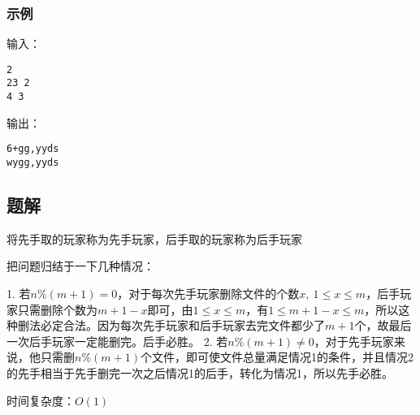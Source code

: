\subsubsection{示例}
输入：
\begin{lstlisting}
2
23 2
4 3
\end{lstlisting}

输出：
\begin{lstlisting}
6+gg,yyds
wygg,yyds
\end{lstlisting}

\subsection{题解}
将先手取的玩家称为先手玩家，后手取的玩家称为后手玩家

把问题归结于一下几种情况：

1. 若$n \% (m + 1) =0$，对于每次先手玩家删除文件的个数$x, \ 1 \leq x \leq m$，后手玩家只需删除个数为$m + 1 -x$即可，由$1 \leq x \leq m$，有$1 \leq m + 1 - x \leq m$，所以这种删法必定合法。因为每次先手玩家和后手玩家去完文件都少了$m + 1$个，故最后一次后手玩家一定能删完。后手必胜。
2. 若$n \% (m + 1) \neq 0$，对于先手玩家来说，他只需删$n \% (m + 1)$个文件，即可使文件总量满足情况1的条件，并且情况2的先手相当于先手删完一次之后情况1的后手，转化为情况1，所以先手必胜。

时间复杂度：$O(1)$
